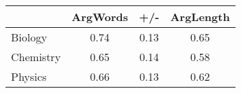 \begin{tabular}{lcc|c}
\toprule
{} &  ArgWords &   +/- &  ArgLength \\
\midrule
Biology   &      0.74 &  0.13 &       0.65 \\
Chemistry &      0.65 &  0.14 &       0.58 \\
Physics   &      0.66 &  0.13 &       0.62 \\
\bottomrule
\end{tabular}

